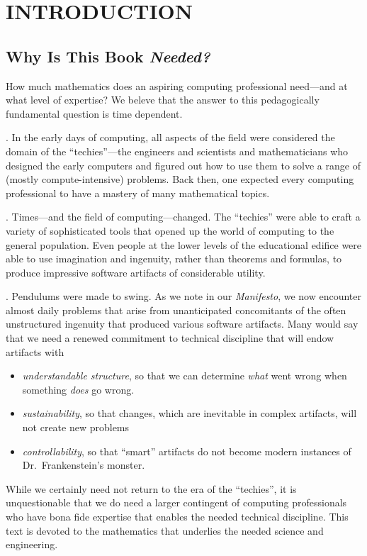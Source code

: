 
\chapter{INTRODUCTION}
\label{ch:intro}

\section{Why Is This Book {\em Needed?}}
\label{sec:bookneeded}

How much mathematics does an aspiring computing professional
need---and at what level of expertise?  We beleve that the answer to
this pedagogically fundamental question is time dependent.

\medskip

.
In the early days of computing, all aspects of the field were
considered the domain of the ``techies''---the engineers and
scientists and mathematicians who designed the early computers and
figured out how to use them to solve a range of (mostly
compute-intensive) problems.  Back then, one expected every computing
professional to have a mastery of many mathematical topics.

\medskip

.
Times---and the field of computing---changed.  The ``techies'' were
able to craft a variety of sophisticated tools that opened up the
world of computing to the general population.  Even people at the
lower levels of the educational edifice were able to use imagination
and ingenuity, rather than theorems and formulas, to produce
impressive software artifacts of considerable utility.

\medskip

.
Pendulums were made to swing.  As we note in our {\it Manifesto}, we
now encounter almost daily problems that arise from unanticipated
concomitants of the often unstructured ingenuity that produced various
software artifacts.  Many would say that we need a renewed commitment
to technical discipline that will endow artifacts with
\begin{itemize}
\item
{\em understandable structure}, so that we can determine {\em what} went
wrong when something {\em does} go wrong.
\item
{\em sustainability}, so that changes, which are inevitable in complex
artifacts, will not create new problems
\item
{\em controllability}, so that ``smart'' artifacts do not become
modern instances of Dr.~Frankenstein's monster.
\end{itemize}
While we certainly need not return to the era of the ``techies'', it
is unquestionable that we do need a larger contingent of computing
professionals who have bona fide expertise that enables the needed
technical discipline.  This text is devoted to the mathematics that
underlies the needed science and engineering.

